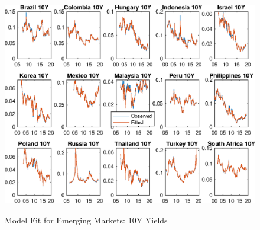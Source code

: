\documentclass{article}
\begin{document}
\begin{figure}[tbph]
	\begin{center}
		\caption{Model Fit for Emerging Markets: 10Y Yields}
		\label{fig:s_ylds_ssb_yQ}
		\includegraphics[trim={0cm 0cm 0cm 0cm},clip,height=1\textheight,width=1.4\textwidth]{../Figures/Estimation/s_ylds_ssb_yQ.eps} \\
	\end{center}
\end{figure}
\end{document}
